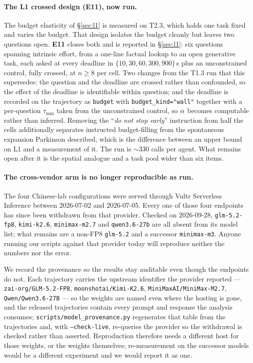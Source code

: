 \paragraph{The L1 crossed design (E11), now run.}
The budget elasticity of \S\ref{sec:l1} is measured on T2.3, which holds one
task fixed and varies the budget. That design isolates the budget cleanly but
leaves two questions open. \textbf{E11} closes both and is reported in
\S\ref{sec:l1}: six questions spanning intrinsic effort, from a one-line
factual lookup to an open generative task, each asked at every deadline in
$\{10, 30, 60, 300, 900\}$\,s plus an unconstrained control, fully crossed, at
$n \geq 8$ per cell. Two changes from the T1.3 run that this supersedes: the
question and the deadline are crossed rather than confounded, so the effect of
the deadline is identifiable within question; and the deadline is recorded on
the trajectory as \texttt{budget} with \texttt{budget\_kind="wall"} together
with a per-question $\tau_{\min}$ taken from the unconstrained control, so
$\alpha$ becomes computable rather than inferred. Removing the
``\textit{do not stop early}'' instruction from half the cells additionally
separates instructed budget-filling from the spontaneous expansion Parkinson
described, which is the difference between an upper bound on L1 and a
measurement of it. The run is ${\sim}330$ calls per agent. What remains open after it is the
spatial analogue and a task pool wider than six items.

\paragraph{The cross-vendor arm is no longer reproducible as run.}
The four Chinese-lab configurations were served through Vultr Serverless
Inference between 2026-07-02 and 2026-07-05. Every one of those four endpoints
has since been withdrawn from that provider. Checked on 2026-09-28,
\texttt{glm-5.2-fp8}, \texttt{kimi-k2.6}, \texttt{minimax-m2.7} and
\texttt{qwen3.6-27b} are all absent from its model list; what remains are a
non-FP8 \texttt{glm-5.2} and a successor \texttt{minimax-m3}. Anyone running
our scripts against that provider today will reproduce neither the numbers nor
the error.

We record the provenance so the results stay auditable even though the
endpoints do not. Each trajectory carries the upstream identifier the provider
reported --- \texttt{zai-org/GLM-5.2-FP8}, \texttt{moonshotai/Kimi-K2.6},
\texttt{MiniMaxAI/MiniMax-M2.7}, \texttt{Qwen/Qwen3.6-27B} --- so the weights
are named even where the hosting is gone, and the released trajectories contain
every prompt and response the analysis consumes; \texttt{scripts/model\_provenance.py}
regenerates that table from the trajectories and, with \texttt{--check-live},
re-queries the provider so the withdrawal is checked rather than asserted.
Reproduction therefore needs a
different host for those weights, or the weights themselves; re-measurement on
the successor models would be a different experiment and we would report it as
one.

